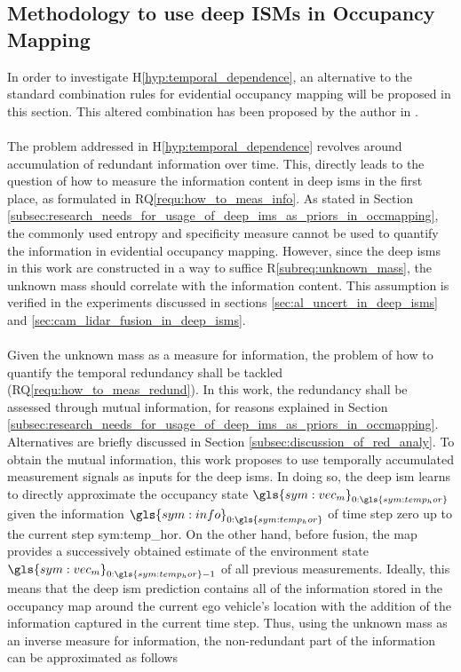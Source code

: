 \subsection{Methodology to use deep ISMs in Occupancy Mapping}
\label{subsec:method_to_use_deep_isms_in_occmaps}
In order to investigate H\ref{hyp:temporal_dependence}, an alternative to the standard combination rules for evidential occupancy mapping will be proposed in this section. This altered combination has been proposed by the author in \cite{bauer2020deep}.
\\\\
The problem addressed in H\ref{hyp:temporal_dependence} revolves around accumulation of redundant information over time. This, directly leads to the question of how to measure the information content in deep \gls{ism}s in the first place, as formulated in RQ\ref{requ:how_to_meas_info}. As stated in Section \ref{subsec:research_needs_for_usage_of_deep_ims_as_priors_in_occmapping}, the commonly used entropy and specificity measure cannot be used to quantify the information in evidential occupancy mapping. However, since the deep \gls{ism}s in this work are constructed in a way to suffice R\ref{subreq:unknown_mass}, the unknown mass should correlate with the information content. This assumption is verified in the experiments discussed in sections \ref{sec:al_uncert_in_deep_isms} and \ref{sec:cam_lidar_fusion_in_deep_isms}.
\\\\
Given the unknown mass as a measure for information, the problem of how to quantify the temporal redundancy shall be tackled (RQ\ref{requ:how_to_meas_redund}). In this work, the redundancy shall be assessed through mutual information, for reasons explained in Section \ref{subsec:research_needs_for_usage_of_deep_ims_as_priors_in_occmapping}. Alternatives are briefly discussed in Section \ref{subsec:discussion_of_red_analy}. To obtain the mutual information, this work proposes to use temporally accumulated measurement signals as inputs for the deep \gls{ism}s. In doing so, the deep \gls{ism} learns to directly approximate the occupancy state $\gls{sym:vec_m}_{0:\gls{sym:temp_hor}}$ given the information $\gls{sym:info}_{0:\gls{sym:temp_hor}}$ of time step zero up to the current step \gls{sym:temp_hor}. On the other hand, before fusion, the map provides a successively obtained estimate of the environment state $\gls{sym:vec_m}_{0:\gls{sym:temp_hor}-1}$ of all previous measurements. Ideally, this means that the deep \gls{ism} prediction contains all of the information stored in the occupancy map around the current ego vehicle's location with the addition of the information captured in the current time step. Thus, using the unknown mass as an inverse measure for information, the non-redundant part of the information can be approximated as follows
